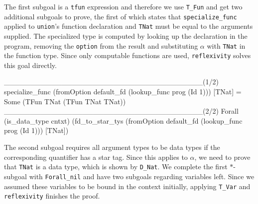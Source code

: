 \documentclass[fleqn, abstract=on]{scrreprt}
\newcommand{\coqinline}[1]{\texttt{#1}}
\begin{document}
The first subgoal is a \coqinline{tfun} expression and therefore we use \coqinline{T_Fun} and get two additional subgoals to prove, the first of which states that \coqinline{specialize_func} applied to \texttt{union}'s function declaration and \texttt{TNat} must be equal to the arguments supplied. The specialized type is computed by looking up the declaration in the program, removing the \coqinline{option} from the result and substituting $\alpha$ with \coqinline{TNat} in the function type. Since only computable functions are used, \coqinline{reflexivity} solves this goal directly.
\begin{coqcode}
______________________________________(1/2)
specialize_func (fromOption default_fd (lookup_func prog (Id 1))) [TNat] =
Some (TFun TNat (TFun TNat TNat))
______________________________________(2/2)
Forall (is_data_type cntxt)
(fd_to_star_tys (fromOption default_fd (lookup_func prog (Id 1))) [TNat])
\end{coqcode}
The second subgoal requires all argument types to be data types if the corresponding quantifier has a star tag. Since this applies to $\alpha$, we need to prove that \coqinline{TNat} is a data type, which is shown by \coqinline{D_Nat}. We complete the first $*$-subgoal with \coqinline{Forall_nil} and have two subgoals regarding variables left. Since we assumed these variables to be bound in the context initially, applying \coqinline{T_Var} and \coqinline{reflexivity} finishes the proof.
\end{document}
